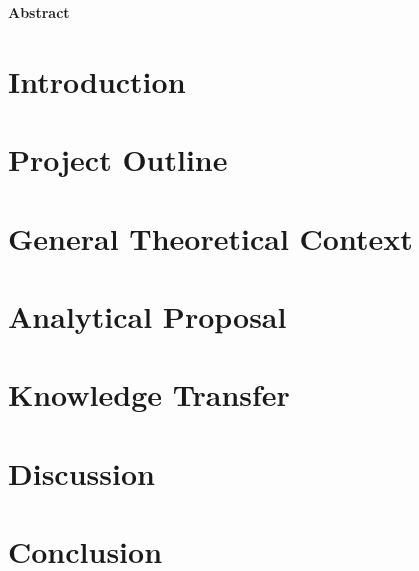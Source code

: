 \documentclass[12pt]{article}
\begin{document}

\newpage

\Large
\noindent
\textbf{Abstract}
\vspace{0.5cm} \\
\noindent
\normalsize

\newpage

\tableofcontents
\newpage

\listoffigures
\newpage
\listoftables
\newpage


    
\section{Introduction}
\label{intro}


\section{Project Outline}
\label{project}


\section{General Theoretical Context}
\label{theory}


\section{Analytical Proposal}
\label{analysis}


\section{Knowledge Transfer}
\label{teaching}


\section{Discussion}
\label{discussion}


\section{Conclusion}
\label{conclusion}

\end{document}
